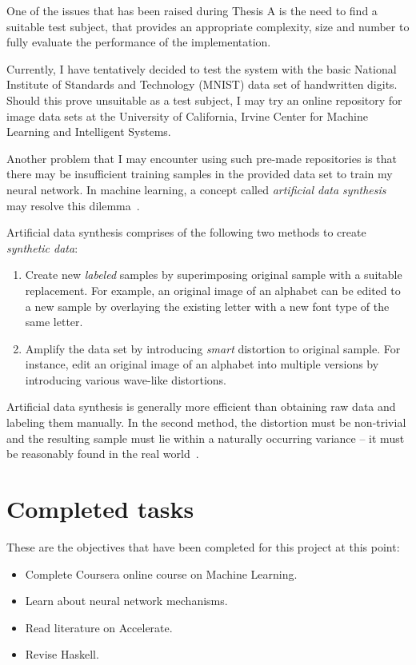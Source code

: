 One of the issues that has been raised during Thesis A is the need to find a suitable test subject, that provides an appropriate complexity, size and number to fully evaluate the performance of the implementation. 

Currently, I have tentatively decided to test the system with the basic National Institute of Standards and Technology (MNIST) data set of handwritten digits. Should this prove unsuitable as a test subject, I may try an online repository for image data sets at the University of California, Irvine Center for Machine Learning and Intelligent Systems.

Another problem that I may encounter using such pre-made repositories is that there may be insufficient training samples in the provided data set to train my neural network. In machine learning, a concept called \textit{artificial data synthesis} may resolve this dilemma~\cite{Ng12}. 

Artificial data synthesis comprises of the following two methods to create \textit{synthetic data}: 
\begin{enumerate}
\item Create new \textit{labeled} samples by superimposing original sample with a suitable replacement. For example, an original image of an alphabet can be edited to a new sample by overlaying the existing letter with a new font type of the same letter.
\item Amplify the data set by introducing \textit{smart} distortion to original sample. For instance, edit an original image of an alphabet into multiple versions by introducing various wave-like distortions.
\end{enumerate}

Artificial data synthesis is generally more efficient than obtaining raw data and labeling them manually. In the second method, the distortion must be non-trivial and the resulting sample must lie within a naturally occurring variance -- it must be reasonably found in the real world~\cite{Ng12}.

\section{Completed tasks} \label{se:completedtasks}

These are the objectives that have been completed for this project at this point:
\begin{itemize}
\item Complete Coursera online course on Machine Learning.
\item Learn about neural network mechanisms.
\item Read literature on Accelerate.
\item Revise Haskell.
\end{itemize}

